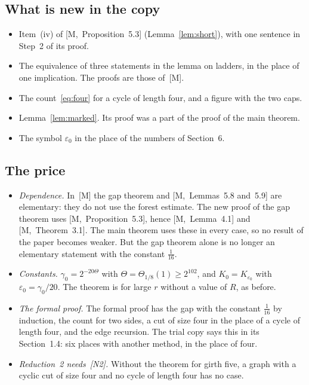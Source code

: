 \documentclass[11pt]{article}
\newcommand{\M}[1]{[M,~#1]}
\begin{document}
\subsection{What is new in the copy}

\begin{itemize}[leftmargin=1.2em]
\item Item~(iv) of \M{Proposition~5.3} (Lemma~\ref{lem:short}), with one sentence in Step~2 of
its proof.
\item The equivalence of three statements in the lemma on ladders, in the place of one
implication. The proofs are those of~[M].
\item The count~\eqref{eq:four} for a cycle of length four, and a figure with the two caps.
\item Lemma~\ref{lem:marked}. Its proof was a part of the proof of the main theorem.
\item The symbol $\varepsilon_0$ in the place of the numbers of Section~6.
\end{itemize}

\subsection{The price}

\begin{itemize}[leftmargin=1.2em]
\item \emph{Dependence.} In~[M] the gap theorem and \M{Lemmas~5.8 and~5.9} are elementary: they
do not use the forest estimate. The new proof of the gap theorem uses \M{Proposition~5.3}, hence
\M{Lemma~4.1} and \M{Theorem~3.1}. The main theorem uses these in every case, so no result of the
paper becomes weaker. But the gap theorem alone is no longer an elementary statement with the
constant $\frac1{16}$.
\item \emph{Constants.} $\gamma_0=2^{-20\Theta}$ with $\Theta=\Theta_{1/8}(1)\ge2^{102}$, and
$K_0=K_{\varepsilon_0}$ with $\varepsilon_0=\gamma_0/20$. The theorem is for large $r$ without a
value of $R$, as before.
\item \emph{The formal proof.} The formal proof has the gap with the constant $\frac1{16}$ by
induction, the count for two sides, a cut of size four in the place of a cycle of length four,
and the edge recursion. The trial copy says this in its Section~1.4: six places with another
method, in the place of four.
\item \emph{Reduction~2 needs~[N2].} Without the theorem for girth five, a graph with a cyclic
cut of size four and no cycle of length four has no case.
\end{itemize}
\end{document}
